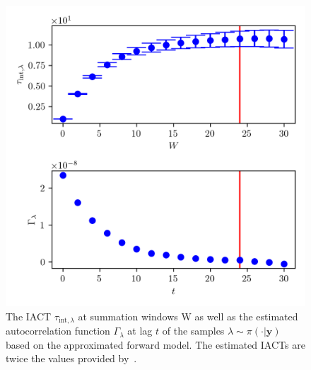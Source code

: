 \begin{figure}[ht!]
	\centering
	\includegraphics{UwerrTauIntSecO3lam.png}
	\caption[IACT and autocorrelation of samples $\lambda \sim \pi( \cdot | \bm{y})$, for approximated model.]{The IACT $\tau_{\text{int},\lambda}$ at summation windows W as well as the estimated autocorrelation function $\Gamma_{\lambda}$ at lag $t$ of the samples $\lambda \sim \pi( \cdot | \bm{y})$ based on the approximated forward model.
	The estimated IACTs are twice the values provided by~\cite{drikHesse, UwerrM}.}
	\label{fig:IATCSecO3lam}
\end{figure}
